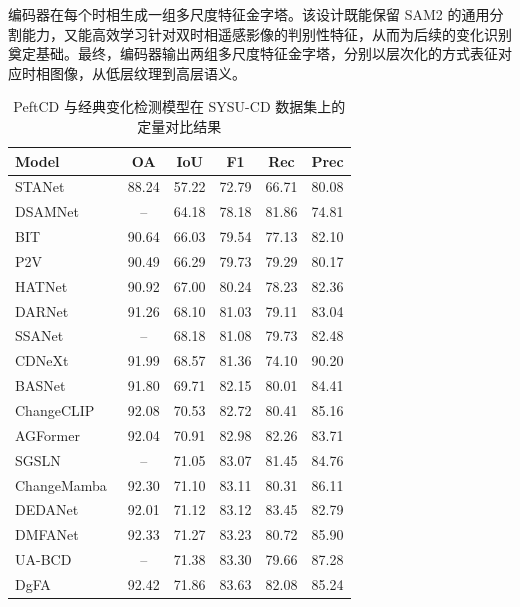 编码器在每个时相生成一组多尺度特征金字塔。该设计既能保留 SAM2 的通用分割能力，又能高效学习针对双时相遥感影像的判别性特征，从而为后续的变化识别奠定基础。最终，编码器输出两组多尺度特征金字塔，分别以层次化的方式表征对应时相图像，从低层纹理到高层语义。  


\begin{table}[!htb]
\centering
\caption{PeftCD 与经典变化检测模型在 SYSU-CD 数据集上的定量对比结果}
\label{tab:peftcd_sysu}
\begin{tabular}{l c c c c c}
\toprule
\textbf{Model} & \textbf{OA} & \textbf{IoU} & \textbf{F1} & \textbf{Rec} & \textbf{Prec} \\
\midrule
STANet~\cite{chen_spatial-temporal_2020} & 88.24 & 57.22 & 72.79 & 66.71 & 80.08 \\
DSAMNet~\cite{shi_deeply_2022} & -- & 64.18 & 78.18 & 81.86 & 74.81 \\
BIT~\cite{chen_remote_2022} & 90.64 & 66.03 & 79.54 & 77.13 & 82.10 \\
P2V~\cite{lin_transition_2023} & 90.49 & 66.29 & 79.73 & 79.29 & 80.17 \\
HATNet~\cite{Xu2024HybridAT} & 90.92 & 67.00 & 80.24 & 78.23 & 82.36 \\
DARNet~\cite{li_densely_2022} & 91.26 & 68.10 & 81.03 & 79.11 & 83.04 \\
SSANet~\cite{Jiang2022JointVL} & -- & 68.18 & 81.08 & 79.73 & 82.48 \\
CDNeXt~\cite{wei_robust_2024} & 91.99 & 68.57 & 81.36 & 74.10 & 90.20 \\
BASNet~\cite{z_wang_bitemporal_2024} & 91.80 & 69.71 & 82.15 & 80.01 & 84.41 \\
ChangeCLIP~\cite{dong2024changeclip} & 92.08 & 70.53 & 82.72 & 80.41 & 85.16 \\
AGFormer~\cite{Chen2025AGFormerAA} & 92.04 & 70.91 & 82.98 & 82.26 & 83.71 \\
SGSLN~\cite{zhao_exchanging_2023} & -- & 71.05 & 83.07 & 81.45 & 84.76 \\
ChangeMamba~\cite{chen2024changemamba} & 92.30 & 71.10 & 83.11 & 80.31 & 86.11 \\
DEDANet~\cite{Li2025DifferenceEA} & 92.01 & 71.12 & 83.12 & 83.45 & 82.79 \\
DMFANet~\cite{Zhan2025DifferenceAwareMF} & 92.33 & 71.27 & 83.23 & 80.72 & 85.90 \\
UA-BCD~\cite{li_overcoming_2025} & -- & 71.38 & 83.30 & 79.66 & 87.28 \\
DgFA~\cite{f_zhou_dual-granularity_2025}   & 92.42 & 71.86 & 83.63 & 82.08 & 85.24 \\

\end{tabular}
\end{table}

